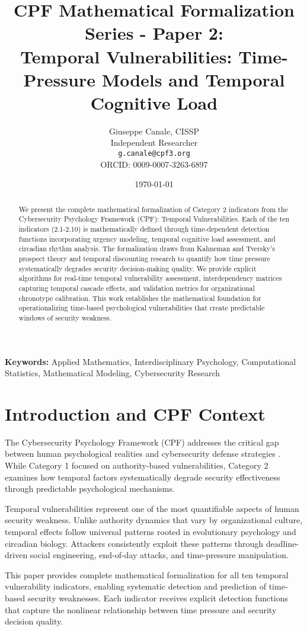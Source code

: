 \documentclass[11pt,a4paper]{article}
\title{CPF Mathematical Formalization Series - Paper 2:\\Temporal Vulnerabilities: Time-Pressure Models and Temporal Cognitive Load}
\author{
    Giuseppe Canale, CISSP\\
    Independent Researcher\\
    \texttt{g.canale@cpf3.org}\\
    ORCID: 0009-0007-3263-6897
}
\date{\today}
\begin{document}
\maketitle

\begin{abstract}
We present the complete mathematical formalization of Category 2 indicators from the Cybersecurity Psychology Framework (CPF): Temporal Vulnerabilities. Each of the ten indicators (2.1-2.10) is mathematically defined through time-dependent detection functions incorporating urgency modeling, temporal cognitive load assessment, and circadian rhythm analysis. The formalization draws from Kahneman and Tversky's prospect theory and temporal discounting research to quantify how time pressure systematically degrades security decision-making quality. We provide explicit algorithms for real-time temporal vulnerability assessment, interdependency matrices capturing temporal cascade effects, and validation metrics for organizational chronotype calibration. This work establishes the mathematical foundation for operationalizing time-based psychological vulnerabilities that create predictable windows of security weakness.
\end{abstract}

\textbf{Keywords:} Applied Mathematics, Interdisciplinary Psychology, Computational Statistics, Mathematical Modeling, Cybersecurity Research

\section{Introduction and CPF Context}

The Cybersecurity Psychology Framework (CPF) addresses the critical gap between human psychological realities and cybersecurity defense strategies \cite{canale2024cpf}. While Category 1 focused on authority-based vulnerabilities, Category 2 examines how temporal factors systematically degrade security effectiveness through predictable psychological mechanisms.

Temporal vulnerabilities represent one of the most quantifiable aspects of human security weakness. Unlike authority dynamics that vary by organizational culture, temporal effects follow universal patterns rooted in evolutionary psychology and circadian biology. Attackers consistently exploit these patterns through deadline-driven social engineering, end-of-day attacks, and time-pressure manipulation.

This paper provides complete mathematical formalization for all ten temporal vulnerability indicators, enabling systematic detection and prediction of time-based security weaknesses. Each indicator receives explicit detection functions that capture the nonlinear relationship between time pressure and security decision quality.
\end{document}
